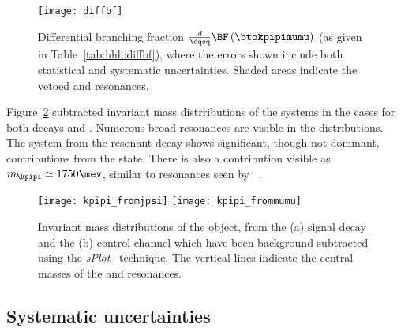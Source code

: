 \begin{figure}
  \begin{center}
    \texttt{[image: diffbf]}
    \caption{\small
      Differential branching fraction $\tfrac{d}{\dqsq}\BF\left(\btokpipimumu\right)$
      (as given in Table~\protect\ref{tab:hhh:diffbf}), where the
      errors shown include both statistical and systematic uncertainties.
      Shaded areas indicate the vetoed \jpsi and \psitwos resonances.
    }
    \label{fig:kpipi:diffbf}
  \end{center}
\end{figure}

Figure~\ref{fig:kpipi:kpipi} subtracted invariant mass distrributions of the \kpipi systems in the
cases for both decays \btojpsikpipi and \btokpipimumu.
Numerous broad resonances are visible in the distributions.
The \kpipi system from the resonant \btojpsikpipi decay shows significant, though not dominant,
contributions from the  state.
There is also a contribution visible as $m_\kpipi\simeq1750\mev$, similar to resonances seen by
\belle~.



%
%

\begin{figure}
  \begin{center}
    \texttt{[image: kpipi\_fromjpsi]}
    \texttt{[image: kpipi\_frommumu]}
    \caption{\small
      Invariant mass distributions of the \kpipi object, from the
      (a) signal decay \btokpipimumu and the
      (b) control channel \btojpsikpipi which have been background subtracted
      using the \emph{sPlot}~\cite{splot} technique.
      The vertical lines indicate the central masses of the  and 
      resonances.
    }
    \label{fig:kpipi:kpipi}
  \end{center}
\end{figure}



\subsection{Systematic uncertainties}





















